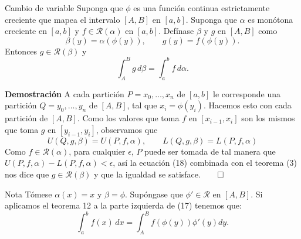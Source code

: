 \documentclass[10pt]{beamer}
\begin{document}
\begin{frame}[allowframebreaks]

\begin{theorem}[13]{Cambio de variable}
Suponga que $\phi$ es una función continua estrictamente creciente que mapea el intervalo $[A, B]$ en $[a, b]$. Suponga que $\alpha$ es monótona creciente en $[a, b]$ y $f \in \mathcal{R}(\alpha)$ en $[a, b]$. Defínase $\beta$ y $g$ en $[A, B]$ como
\begin{equation}
	\beta(y) = \alpha(\phi(y)), \qquad g(y) = f(\phi(y)).
\end{equation}
Entonces $g \in \mathcal{R}(\beta)$ y
\begin{equation}
	\int_A^B g\,d\beta = \int_a^b f\,d\alpha.
\end{equation}
\end{theorem}

\textbf{Demostración}
A cada partición $P={x_0, \dots, x_n}$ de $[a, b]$ le corresponde una partición $Q={y_0,\dots,y_n}$ de $[A, B]$, tal que $x_i = \phi(y_i)$. Hacemos esto con cada partición de $[A, B]$. Como los valores que toma $f$ en $[x_{i-1}, x_i]$ son los mismos que toma $g$ en $[y_{i-1}, y_i]$, observamos que
\begin{equation}
	U(Q, g, \beta) = U(P, f, \alpha), \qquad L(Q, g, \beta) = L(P, f, \alpha)
\end{equation}
Como $f \in \mathcal{R}(\alpha)$, para cualquier $\epsilon$, $P$ puede ser tomada de tal manera que $U(P, f, \alpha)-L(P, f, \alpha) < \epsilon$, así la ecuación (18) combinada con el teorema (3) nos dice que $g \in \mathcal{R}(\beta)$ y que la igualdad se satisface.$\qed$

\begin{block}{Nota}
Tómese $\alpha(x) = x$ y $\beta = \phi$. Supóngase que $\phi' \in \mathcal{R}$ en $[A, B]$. Si aplicamos el teorema 12 a la parte izquierda de (17) tenemos que:
\[
	\int_a^b f(x)\,dx = \int_A^B f(\phi(y))\phi'(y)dy.
\]
\end{block}

\end{frame}
\end{document}
